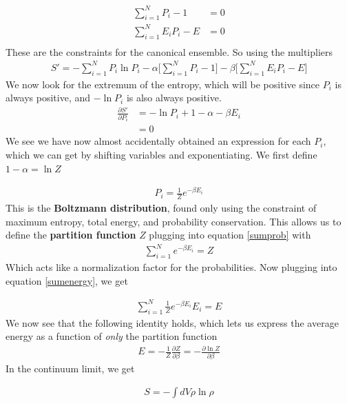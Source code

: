 \begin{align}\label{sumprob}
\sum_{i=1}^N P_i -1 &= 0\\ \label{sumenergy}
\sum_{i=1}^N E_iP_i - E &= 0\\
\end{align}
These are the constraints for the canonical ensemble. So using the multipliers
\begin{align}
S' = -\sum_{i=1}^N P_i\ln P_i - \alpha\Big[\sum_{i=1}^N P_i -1\Big] - \beta\Big[\sum_{i=1}^N E_iP_i - E\Big]
\end{align}
We now look for the extremum of the entropy, which will be positive since $P_i$ is always positive, and $-\ln P_i$ is also always positive. 
\begin{align}
\frac{\partial S'}{\partial P_i} &= -\ln P_i  + 1 -\alpha - \beta E_i\\
 &= 0 
\end{align}
We see we have now almost accidentally obtained an expression for each $P_i$, which we can get by shifting variables and exponentiating. We first define $1-\alpha = \ln Z$

\begin{align}\label{stat-probability}
P_i = \frac{1}{Z}e^{-\beta E_i}
\end{align}
This is the \textbf{Boltzmann distribution}, found only using the constraint of maximum entropy, total energy, and probability conservation. This allows us to define the \textbf{partition function} $Z$ plugging into equation \ref{sumprob} with
\begin{align}
\sum_{i=1}^N e^{-\beta E_i} = Z
\end{align}
Which acts like a normalization factor for the probabilities. Now plugging into equation \ref{sumenergy}, we get

\begin{align}
\sum_{i=1}^N \frac{1}{Z}e^{-\beta E_i}E_i = E
\end{align}
We now see that the following identity holds, which lets us express the average energy as a function of \emph{only} the partition function
\begin{align}\label{partenergy}
E = -\frac{1}{Z}\frac{\partial Z}{\partial \beta} = -\frac{\partial \ln Z}{\partial \beta}
\end{align}
In the continuum limit, we get 

\begin{align}
S = -\int dV \rho \ln\rho
\end{align}

